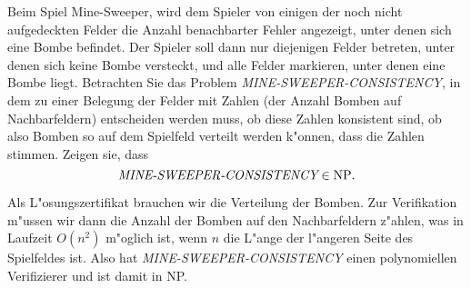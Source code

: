Beim Spiel Mine-Sweeper, wird dem Spieler von einigen der noch nicht
aufgedeckten Felder die Anzahl benachbarter Fehler angezeigt, unter
denen sich eine Bombe befindet. Der Spieler soll dann nur diejenigen
Felder betreten, unter denen sich keine Bombe versteckt, und alle
Felder markieren, unter denen eine Bombe liegt. Betrachten Sie das
Problem {\it MINE-SWEEPER-CONSISTENCY}, in dem zu einer Belegung der
Felder mit Zahlen (der Anzahl Bomben auf Nachbarfeldern) entscheiden
werden muss, ob diese Zahlen konsistent sind, ob also Bomben so
auf dem Spielfeld verteilt werden k"onnen, dass die Zahlen stimmen.
Zeigen sie, dass
\[
\text{\it MINE-SWEEPER-CONSISTENCY}\in \text{NP}.
\]

\begin{loesung}
Als L"osungszertifikat brauchen wir die Verteilung der Bomben.
Zur Verifikation m"ussen wir dann die Anzahl der Bomben auf den
Nachbarfeldern z"ahlen, was in Laufzeit $O(n^2)$ m"oglich ist,
wenn $n$ die L"ange der l"angeren Seite des Spielfeldes ist.
Also hat
{\it MINE-SWEEPER-CONSISTENCY} einen polynomiellen Verifizierer und
ist damit in NP.
\end{loesung}
